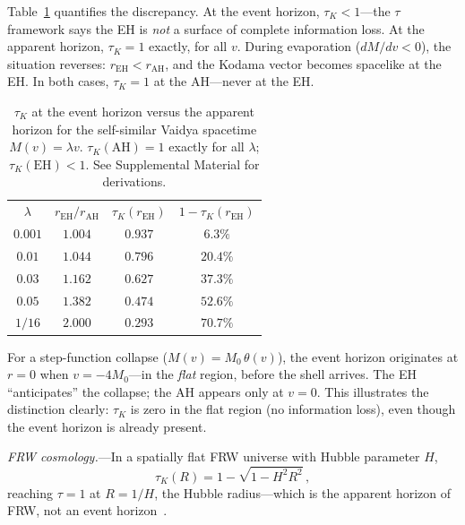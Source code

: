 \documentclass[prl,twocolumn,superscriptaddress,longbibliography,floatfix]{revtex4-2}
\newcommand{\tauasym}{\tau}
\begin{document}
Table~\ref{tab:AH_EH} quantifies the discrepancy.
At the event horizon, $\tauasym_{K} < 1$---the
$\tauasym$ framework says the EH is \emph{not} a surface
of complete information loss.
At the apparent horizon, $\tauasym_{K} = 1$ exactly,
for all $v$.
During evaporation ($dM/dv < 0$), the situation reverses:
$r_{\text{EH}} < r_{\text{AH}}$, and the Kodama vector
becomes spacelike at the EH.
In both cases, $\tauasym_{K} = 1$ at the AH---never
at the EH.

\begin{table}[t]
\caption{\label{tab:AH_EH}%
$\tauasym_{K}$ at the event horizon versus the
apparent horizon for the self-similar Vaidya
spacetime $M(v) = \lambda v$.
$\tauasym_{K}(\text{AH}) = 1$ exactly for all
$\lambda$; $\tauasym_{K}(\text{EH}) < 1$.
See Supplemental Material for derivations.}
\begin{ruledtabular}
\begin{tabular}{cccc}
  $\lambda$ & $r_{\text{EH}}/r_{\text{AH}}$
    & $\tauasym_{K}(r_{\text{EH}})$
    & $1 - \tauasym_{K}(r_{\text{EH}})$ \\
  \colrule
  $0.001$ & $1.004$ & $0.937$ & $6.3\%$ \\
  $0.01$  & $1.044$ & $0.796$ & $20.4\%$ \\
  $0.03$  & $1.162$ & $0.627$ & $37.3\%$ \\
  $0.05$  & $1.382$ & $0.474$ & $52.6\%$ \\
  $1/16$  & $2.000$ & $0.293$ & $70.7\%$ \\
\end{tabular}
\end{ruledtabular}
\end{table}

For a step-function collapse ($M(v) = M_0\,\theta(v)$),
the event horizon originates at $r = 0$ when
$v = -4M_0$---in the \emph{flat} region, before the
shell arrives.
The EH ``anticipates'' the collapse; the AH appears
only at $v = 0$.
This illustrates the distinction clearly:
$\tauasym_{K}$ is zero in the flat region (no information
loss), even though the event horizon is already present.

\emph{FRW cosmology.}---In a spatially flat FRW universe
with Hubble parameter $H$,
\begin{equation}
  \tauasym_{K}(R) = 1 - \sqrt{1 - H^{2}R^{2}}\,,
  \label{eq:tau_FRW}
\end{equation}
reaching $\tauasym = 1$ at $R = 1/H$, the Hubble
radius---which is the apparent horizon of FRW, not an
event horizon~\cite{AbreuVisser2010}.
\end{document}
